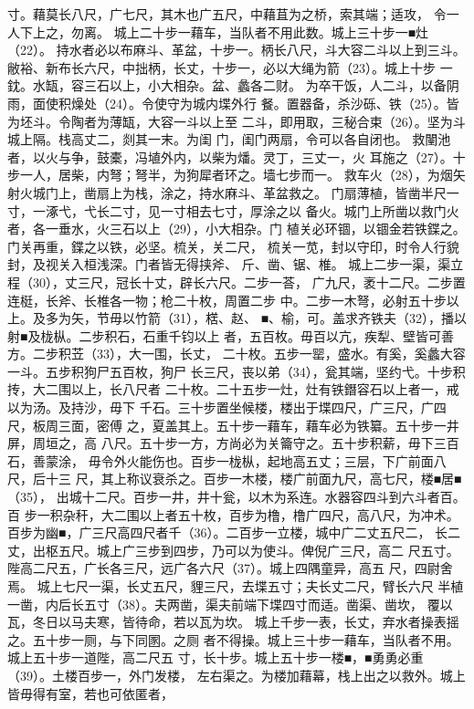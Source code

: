 \documentclass[12pt,UTF8]{ctexbook}
\begin{document}
寸。藉莫长八尺，广七尺，其木也广五尺，中藉苴为之桥，索其端；适攻， 
令一人下上之，勿离。 
城上二十步一藉车，当队者不用此数。城上三十步一■灶（22）。 
持水者必以布麻斗、革盆，十步一。柄长八尺，斗大容二斗以上到三斗。 
敝裕、新布长六尺，中拙柄，长丈，十步一，必以大绳为箭（23）。城上十步 
一鈂。水缻，容三石以上，小大相杂。盆、蠡各二财。 
为卒干饭，人二斗，以备阴雨，面使积燥处（24）。令使守为城内堞外行 
餐。置器备，杀沙砾、铁（25）。皆为坯斗。令陶者为薄缻，大容一斗以上至 
二斗，即用取，三秘合束（26）。坚为斗城上隔。栈高丈二，剡其一末。为闺 
门，闺门两扇，令可以各自闭也。 
救闉池者，以火与争，鼓橐，冯埴外内，以柴为燔。灵丁，三丈一，火 
耳施之（27）。十步一人，居柴，内弩；弩半，为狗犀者环之。墙七步而一。 
救车火（28），为烟矢射火城门上，凿扇上为栈，涂之，持水麻斗、革盆救之。 
门扇薄植，皆凿半尺一寸，一涿弋，弋长二寸，见一寸相去七寸，厚涂之以 
备火。城门上所凿以救门火者，各一垂水，火三石以上（29），小大相杂。门 
植关必环锢，以锢金若铁鍱之。门关再重，鍱之以铁，必坚。梳关，关二尺， 
梳关一苋，封以守印，时令人行貌封，及视关入桓浅深。门者皆无得挟斧、 
斤、凿、锯、椎。 
城上二步一渠，渠立程（30），丈三尺，冠长十丈，辟长六尺。二步一荅， 
广九尺，袤十二尺。二步置连梃，长斧、长椎各一物；枪二十枚，周置二步 
中。二步一木弩，必射五十步以上。及多为矢，节毋以竹箭（31），楛、赵、 
■、榆，可。盖求齐铁夫（32），播以射■及栊枞。二步积石，石重千钧以上 
者，五百枚。毋百以亢，疾犁、壁皆可善方。二步积苙（33），大一围，长丈， 
二十枚。五步一罂，盛水。有奚，奚蠡大容一斗。五步积狗尸五百枚，狗尸 
长三尺，丧以弟（34），瓮其端，坚约弋。十步积抟，大二围以上，长八尺者 
二十枚。二十五步一灶，灶有铁鐕容石以上者一，戒以为汤。及持沙，毋下 
千石。三十步置坐候楼，楼出于堞四尺，广三尺，广四尺，板周三面，密傅 
之，夏盖其上。五十步一藉车，藉车必为铁纂。五十步一井屏，周垣之，高 
八尺。五十步一方，方尚必为关籥守之。五十步积薪，毋下三百石，善蒙涂， 
毋令外火能伤也。百步一栊枞，起地高五丈；三层，下广前面八尺，后十三 
尺，其上称议衰杀之。百步一木楼，楼广前面九尺，高七尺，楼■居■（35）， 
出城十二尺。百步一井，井十瓮，以木为系连。水器容四斗到六斗者百。百 
步一积杂秆，大二围以上者五十枚，百步为橹，橹广四尺，高八尺，为冲术。 
百步为幽■，广三尺高四尺者千（36）。二百步一立楼，城中广二丈五尺二， 
长二丈，出枢五尺。城上广三步到四步，乃可以为使斗。俾倪广三尺，高二 
尺五寸。陛高二尺五，广长各三尺，远广各六尺（37）。城上四隅童异，高五 
尺，四尉舍焉。 
城上七尺一渠，长丈五尺，貍三尺，去堞五寸；夫长丈二尺，臂长六尺 
半植一凿，内后长五寸（38）。夫两凿，渠夫前端下堞四寸而适。凿渠、凿坎， 
覆以瓦，冬日以马夫寒，皆待命，若以瓦为坎。 
城上千步一表，长丈，弃水者操表摇之。五十步一厕，与下同圂。之厕 
者不得操。城上三十步一藉车，当队者不用。城上五十步一道陛，高二尺五 
寸，长十步。城上五十步一楼■，■勇勇必重（39）。土楼百步一，外门发楼， 
左右渠之。为楼加藉幕，栈上出之以救外。城上皆毋得有室，若也可依匿者， 
\end{document}
